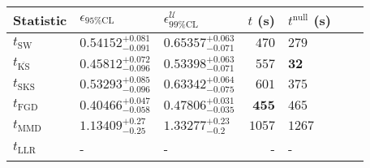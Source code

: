 \begin{tabular}{l|llr|llr}
	Statistic & $\epsilon_{95\%\mathrm{CL}}$ & $\epsilon^    {\mathcal{U}}_{99\%\mathrm{CL}}$ & $t$ (s) & $t^{\mathrm{null}}$ (s) \\
	\midrule
	$t_{\mathrm{SW}}$ & $0.54152_{-0.091}^{+0.081}$ & $0.65357_{-0.071}^{+0.063}$ & $470$ & $279$ \\
	$t_{\overline{\mathrm{KS}}}$ & $0.45812_{-0.096}^{+0.072}$ & $0.53398_{-0.071}^{+0.063}$ & $557$ & ${\mathbf{32}}$ \\
	$t_{\mathrm{SKS}}$ & $0.53293_{-0.096}^{+0.085}$ & $0.63342_{-0.075}^{+0.064}$ & $601$ & $375$ \\
	$t_{\mathrm{FGD}}$ & ${\mathbf{0.40466_{-0.058}^{+0.047}}}$ & ${\mathbf{0.47806_{-0.035}^{+0.031}}}$ & ${\mathbf{455}}$ & $465$ \\
	$t_{\mathrm{MMD}}$ & $1.13409_{-0.25}^{+0.27}$ & $1.33277_{-0.2}^{+0.23}$ & $1057$ & $1267$ \\
	$t_{\mathrm{LLR}}$ & - & - & - & - \\
	\bottomrule
\end{tabular}